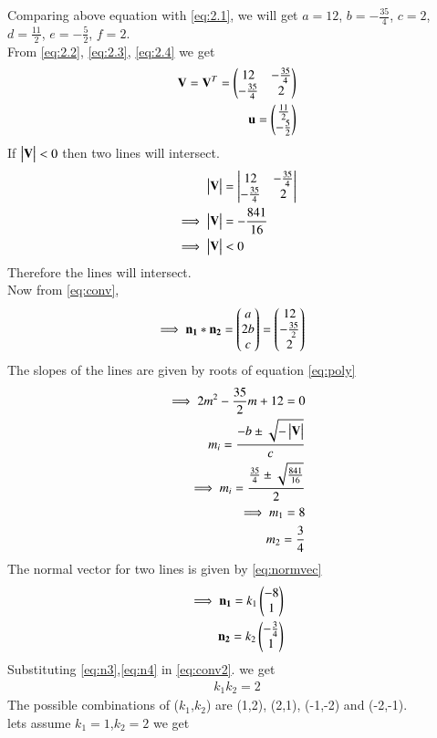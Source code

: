 \documentclass[journal,12pt,twocolumn]{IEEEtran}
\begin{document}
Comparing above equation with \eqref{eq:2.1}, we will get $a=12$, $b=-\frac{35}{4}$, $c=2$, $d=\frac{11}{2}$, $e=-\frac{5}{2}$, $f=2$.\\
From \eqref{eq:2.2}, \eqref{eq:2.3}, \eqref{eq:2.4} we get
\begin{align}
    \mathbf{V}=\mathbf{V}^T=\begin{pmatrix}12 & -\frac{35}{4} \\ -\frac{35}{4} & 2\end{pmatrix}\label{eq:2.48}\\
    \mathbf{u}=\begin{pmatrix}\frac{11}{2} \\ -\frac{5}{2}\end{pmatrix}\label{eq:2.49}
\end{align}
If $\begin{vmatrix}\mathbf{V}\end{vmatrix}<0$ then two lines will intersect.
\begin{align}
    \begin{vmatrix}\mathbf{V}\end{vmatrix}&=\begin{vmatrix}12 & -\frac{35}{4} \\ -\frac{35}{4} & 2\end{vmatrix}\\
    \implies\begin{vmatrix}\mathbf{V}\end{vmatrix}&=-\frac{841}{16}\\
    \implies\begin{vmatrix}\mathbf{V}\end{vmatrix}&<0
\end{align}
Therefore the lines will intersect.\\
Now from \eqref{eq:conv},
\begin{align}
    \implies\mathbf{n_1}*\mathbf{n_2}&=\begin{pmatrix}a \\ 2b \\c\end{pmatrix}=\begin{pmatrix}12\\-\frac{35}{2}\\2\end{pmatrix}\label{eq:conv2}
\end{align}
The slopes of the lines are given by roots of equation \eqref{eq:poly}
\begin{align}
    \implies 2m^2-\frac{35}{2}m+12=0\\
    m_i=\frac{-b\pm{\sqrt{-\ensuremath{\begin{vmatrix}\mathbf{V}\end{vmatrix}}}}}{c}\\
    \implies m_i=\frac{\frac{35}{4}\pm{\sqrt{\frac{841}{16}}}}{2}\\
    \implies m_1=8\\
     m_2=\frac{3}{4}
\end{align}
The normal vector for two lines is given by \eqref{eq:normvec}
\begin{align}
    \implies\mathbf{n_1}=k_1\begin{pmatrix}-8\\1\end{pmatrix}\label{eq:n3}\\
    \mathbf{n_2}=k_2\begin{pmatrix}-\frac{3}{4}\\1\end{pmatrix}\label{eq:n4}
\end{align}
Substituting \eqref{eq:n3},\eqref{eq:n4} in \eqref{eq:conv2}. we get
\begin{align}
    k_1k_2=2
\end{align}
The possible combinations of ($k_1$,$k_2$) are (1,2), (2,1), (-1,-2) and (-2,-1).\\
lets assume $k_1=1$,$k_2=2$ we get
\end{document}
